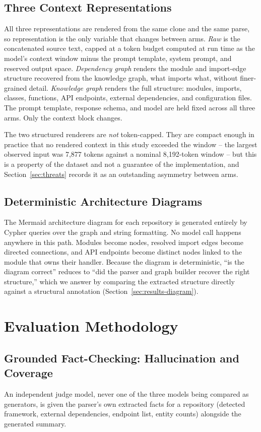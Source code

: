 \documentclass[conference]{IEEEtran}
\begin{document}
\subsection{Three Context Representations}
All three representations are rendered from the same clone and the same parse, so representation
is the only variable that changes between arms. \emph{Raw} is the concatenated source text,
capped at a token budget computed at run time as the model's context window minus the prompt
template, system prompt, and reserved output space. \emph{Dependency graph} renders the module
and import-edge structure recovered from the knowledge graph, what imports what, without
finer-grained detail. \emph{Knowledge graph} renders the full structure: modules, imports,
classes, functions, API endpoints, external dependencies, and configuration files. The prompt
template, response schema, and model are held fixed across all three arms. Only the context
block changes.

The two structured renderers are \emph{not} token-capped. They are compact enough in practice
that no rendered context in this study exceeded the window -- the largest observed input was
7{,}877 tokens against a nominal 8{,}192-token window -- but this is a property of the dataset
and not a guarantee of the implementation, and Section~\ref{sec:threats} records it as an
outstanding asymmetry between arms.

\subsection{Deterministic Architecture Diagrams}
The Mermaid architecture diagram for each repository is generated entirely by Cypher queries
over the graph and string formatting. No model call happens anywhere in this path. Modules
become nodes, resolved import edges become directed connections, and API endpoints become
distinct nodes linked to the module that owns their handler. Because the diagram is
deterministic, ``is the diagram correct'' reduces to ``did the parser and graph builder recover
the right structure,'' which we answer by comparing the extracted structure directly against a
structural annotation (Section~\ref{sec:results-diagram}).

\section{Evaluation Methodology}
\label{sec:methodology}

\subsection{Grounded Fact-Checking: Hallucination and Coverage}
An independent judge model, never one of the three models being compared as generators, is
given the parser's own extracted facts for a repository (detected framework, external
dependencies, endpoint list, entity counts) alongside the generated summary.
\end{document}
